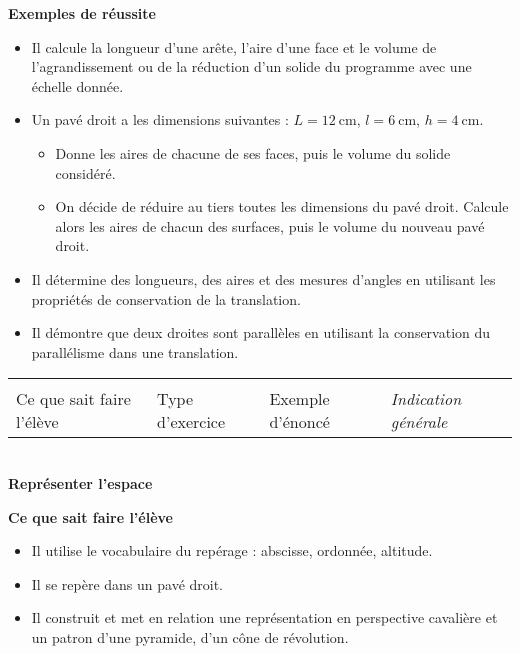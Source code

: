 \documentclass[10pt]{article}
\newcommand{\RR}{\begin{tikzpicture} \draw[BleuRoi,fill=BleuRoi] (0,0) circle (0.06); \end{tikzpicture}}
\newcommand{\LR}{\begin{tikzpicture} \draw[BleuRoi,fill=BleuRoi] (0.05,0) -- (0,0.075) -- (-0.05,0) -- (0,-0.075) --cycle; \end{tikzpicture}}
\newcommand{\CR}{\begin{tikzpicture} \draw[BleuRoi,fill=BleuRoi] (0,0) -- (0,0.1) -- (0.1,0.1) -- (0.1,0) -- cycle; \end{tikzpicture}}
\newcommand{\theme}[1]
{\vspace{4ex}\begin{tabularx}{\textwidth}{|XXXX|}\arrayrulecolor{BleuRoi}
    \multicolumn{4}{c}{\sffamily\color{white}\cellcolor{BleuRoi}\Large{\phantom{É}#1\phantom{É}}\rmfamily} \\\normalsize
    \RR{} Ce que sait faire l'élève & \LR{} Type d'exercice & \CR{} Exemple d'énoncé & \textit{Indication générale} \\\hline
\end{tabularx}\vspace{3ex}}
\newcommand{\competence}[1]{\par\color{BleuRoi}\makebox[\linewidth]{\rule{\textwidth}{2pt}}\\{\bfseries\Large#1}\color{black}\vspace{1em}}
\newenvironment{savoireleves}{%
    \renewcommand{\labelitemi}{\RR}%
    \color{black}%
    \par\textbf{Ce que sait faire l'élève}
    \begin{itemize}
    \setlength{\itemsep}{-0.2em}%
}{
    \end{itemize}
}
\newenvironment{exemplesreussite}{%
    \renewcommand{\labelitemi}{\LR}%
    \renewcommand{\labelitemii}{-}%
    \color{black}%
    \par\textbf{Exemples de réussite}
    \begin{itemize}
    \setlength{\itemsep}{-0.2em}%
}{
    \end{itemize}
}
\newenvironment{sousitemize}{
    \color{black}%
    \vspace{-1em}%
    \begin{itemize}
    \setlength{\itemsep}{0em}%
}{
    \end{itemize}
}
\begin{document}
    \begin{exemplesreussite}
        \item Il calcule la longueur d’une arête, l’aire d’une face et le volume de l’agrandissement ou de la réduction d’un solide du programme avec une échelle donnée.
        \item Un pavé droit a les dimensions suivantes : $L = \qty{12}{\centi\metre}$, $l = \qty{6}{\centi\metre}$, $h = \qty{4}{\centi\metre}$.
        \begin{sousitemize}
            \item Donne les aires de chacune de ses faces, puis le volume du solide considéré.
            \item On décide de réduire au tiers toutes les dimensions du pavé droit. Calcule alors les aires de chacun des surfaces, puis le volume du nouveau pavé droit.
        \end{sousitemize}
        \item Il détermine des longueurs, des aires et des mesures d’angles en utilisant les propriétés de conservation de la translation.
        \item Il démontre que deux droites sont parallèles en utilisant la conservation du parallélisme dans une translation.
    \end{exemplesreussite}

    \clearpage
    \theme{ESPACE ET GÉOMÉTRIE}
    \competence{Représenter l'espace}

    \begin{savoireleves}
        \item Il utilise le vocabulaire du repérage : abscisse, ordonnée, altitude.
        \item Il se repère dans un pavé droit.
        \item Il construit et met en relation une représentation en perspective cavalière et un patron d’une pyramide, d’un cône de révolution.
    \end{savoireleves}
\end{document}
